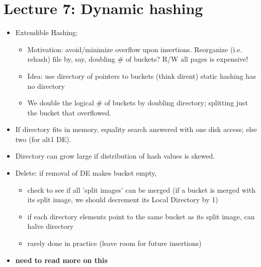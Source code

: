 \documentclass{article}
\begin{document}
\section{Lecture 7: Dynamic hashing}
\begin{itemize}
    \item Extendible Hashing:
    \begin{itemize}
        \item Motivation: avoid/minimize overflow upon insertions. Reorganize (i.e. rehash) file by, say, doubling \# of buckets?
            \subitem R/W all pages is expensive!
        \item Idea: use directory of pointers to buckets (think dirent)
            \subitem static hashing has no directory
        \item We double the logical \# of buckets by doubling directory; splitting just the bucket that overflowed.
    \end{itemize}
    \item If directory fits in memory, equality search answered with one disk access; else two (for alt1 DE).
    \item Directory can grow large if distribution of hash values is skewed.
    \item Delete: if removal of DE makes bucket empty,
    \begin{itemize}
        \item check to see if all 'split images' can be merged (if a bucket is merged with its split image, we should decrement its Local Directory by 1)
        \item if each directory elements point to the same bucket as its split image, can halve directory
        \item rarely done in practice (leave room for future insertions)
    \end{itemize}
    \item \textbf{need to read more on this}
\end{itemize}
\end{document}

